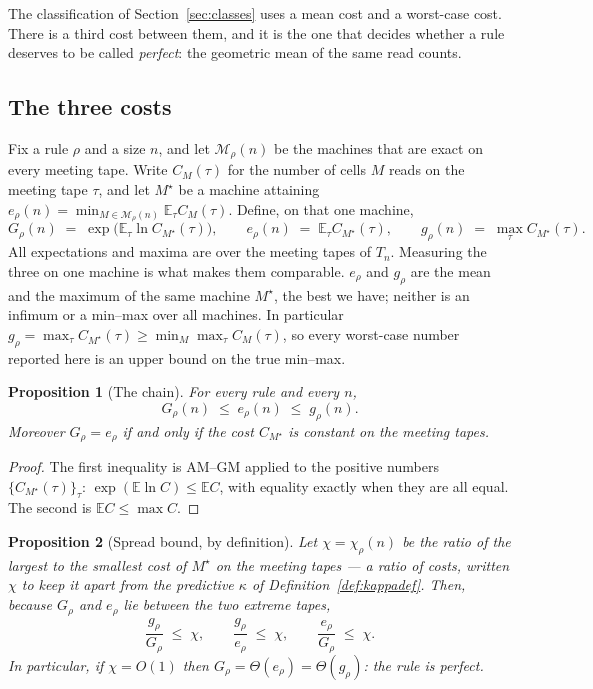 \documentclass[11pt]{article}
\newtheorem{proposition}{Proposition}
\theoremstyle{remark}
\begin{document}
The classification of Section~\ref{sec:classes} uses a mean cost and a worst-case cost.  There is a
third cost between them, and it is the one that decides whether a rule deserves to be called
\emph{perfect}: the geometric mean of the same read counts.

\subsection*{The three costs}

Fix a rule $\rho$ and a size $n$, and let $\mathcal{M}_\rho(n)$ be the machines that are exact on
every meeting tape.  Write $C_M(\tau)$ for the number of cells $M$ reads on the meeting tape $\tau$,
and let $M^{\star}$ be a machine attaining $e_\rho(n)=\min_{M\in\mathcal{M}_\rho(n)}\mathbb{E}_\tau
C_M(\tau)$.  Define, on that one machine,
\begin{equation}\label{eq:three}
  G_\rho(n)\;=\;\exp\bigl(\mathbb{E}_\tau\ln C_{M^{\star}}(\tau)\bigr),
  \qquad
  e_\rho(n)\;=\;\mathbb{E}_\tau C_{M^{\star}}(\tau),
  \qquad
  g_\rho(n)\;=\;\max_\tau C_{M^{\star}}(\tau).
\end{equation}
All expectations and maxima are over the meeting tapes of $T_n$.  Measuring the three on one machine
is what makes them comparable. $e_\rho$ and $g_\rho$ are the mean and the maximum of the same
machine $M^{\star}$, the best we have; neither is an infimum or a min--max over all machines. In
particular $g_\rho=\max_\tau C_{M^{\star}}(\tau)\ge\min_M\max_\tau C_M(\tau)$, so every worst-case
number reported here is an upper bound on the true min--max.

\begin{proposition}[The chain]\label{prop:chain}
For every rule and every $n$,
\begin{equation}
  G_\rho(n)\;\le\;e_\rho(n)\;\le\;g_\rho(n).
\end{equation}
Moreover $G_\rho=e_\rho$ if and only if the cost $C_{M^{\star}}$ is constant on the meeting tapes.
\end{proposition}

\begin{proof}
The first inequality is AM--GM applied to the positive numbers $\{C_{M^{\star}}(\tau)\}_{\tau}$:
$\exp(\mathbb{E}\ln C)\le\mathbb{E} C$, with equality exactly when they are all equal.  The second is
$\mathbb{E} C\le\max C$.
\end{proof}

\begin{proposition}[Spread bound, by definition]\label{prop:spread}
Let $\chi=\chi_\rho(n)$ be the ratio of the largest to the smallest cost of $M^{\star}$ on the
meeting tapes --- a ratio of costs, written $\chi$ to keep it apart from the predictive
$\kappa$ of Definition~\ref{def:kappadef}.  Then, because $G_\rho$ and $e_\rho$ lie between the two
extreme tapes,
\begin{equation}
  \frac{g_\rho}{G_\rho}\;\le\;\chi,
  \qquad
  \frac{g_\rho}{e_\rho}\;\le\;\chi,
  \qquad
  \frac{e_\rho}{G_\rho}\;\le\;\chi .
\end{equation}
In particular, if $\chi=O(1)$ then $G_\rho=\Theta(e_\rho)=\Theta(g_\rho)$: the rule is
\emph{perfect}.
\end{proposition}
\end{document}
